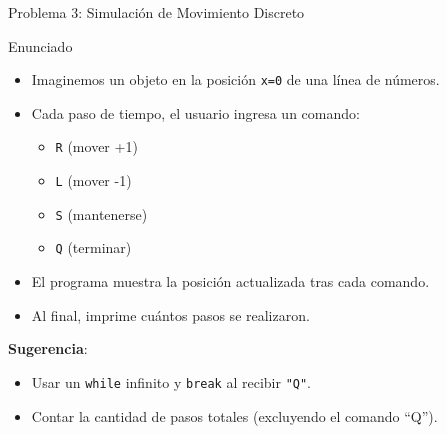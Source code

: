 \documentclass[10pt]{beamer}
\begin{document}
\begin{frame}{Problema 3: Simulación de Movimiento Discreto}
  \begin{block}{Enunciado}
    \begin{itemize}
      \item Imaginemos un objeto en la posición \texttt{x=0} de una línea de números.
      \item Cada paso de tiempo, el usuario ingresa un comando:
        \begin{itemize}
          \item \texttt{R} (mover +1)
          \item \texttt{L} (mover -1)
          \item \texttt{S} (mantenerse)
          \item \texttt{Q} (terminar)
        \end{itemize}
      \item El programa muestra la posición actualizada tras cada comando.
      \item Al final, imprime cuántos pasos se realizaron.
    \end{itemize}
  \end{block}
  \textbf{Sugerencia}:
  \begin{itemize}
    \item Usar un \texttt{while} infinito y \texttt{break} al recibir \texttt{"Q"}.
    \item Contar la cantidad de pasos totales (excluyendo el comando “Q”).
  \end{itemize}
\end{frame}
\end{document}
